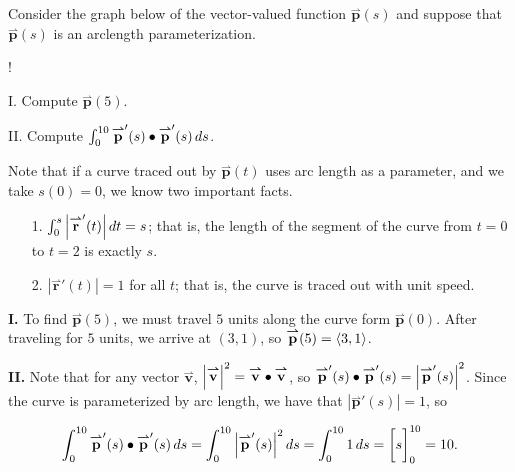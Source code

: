 \documentclass[noauthor,handout]{ximera}
\newcommand{\Mag}[1]{\left| \vec{#1} \right|}
\renewcommand{\vec}[1]{{\overset{\boldsymbol{\rightharpoonup}}{\mathbf{#1}}}}
\begin{document}

\begin{problem}
Consider the graph below of the vector-valued
function $\vec{p}(s)$ and suppose that $\vec{p}(s)$ is
an arclength parameterization.   %

\begin{center}
\resizebox {6cm} {!} { 
    }
\end{center}

I. Compute $\vec{p}(5)$.

II. Compute $\int_0^{10} \vec{p}'(s)\dotp\vec{p}'(s)\d s$.

\begin{freeResponse}
Note that if a curve traced out by $\vec{p}(t)$ uses arc length as a parameter, and we take $s(0)=0$, we know two important facts.

\begin{itemize}
\item[1.] $\int_0^s \left|\vec{r}'(t)\right| \d t = s$; that is, the length of the segment of the curve from $t=0$ to $t=2$ is exactly $s$.
\item[2.] $ \left|\vec{r}'(t)\right| = 1 $ for all $t$; that is, the curve is traced out with unit speed.
\end{itemize} 

\textbf{I.} To find $\vec{p}(5)$, we must travel $5$ units along the curve form $\vec{p}(0)$.  After traveling for $5$ units, we arrive at $(3,1)$, so $\vec{p}(5) = \vector{3,1}$.

\textbf{II.} Note that for any vector $\vec{v}$, $\Mag{v}^2 = \vec{v} \dotp \vec{v}$, so $\vec{p}'(s)\dotp\vec{p}'(s) = \left|\vec{p}'(s)\right|^2$.  Since the curve is parameterized by arc length, we have that $\left|\vec{p}'(s)\right| =1$, so 

\[
\int_0^{10} \vec{p}'(s)\dotp\vec{p}'(s)\d s = \int_0^{10} \left|\vec{p}'(s)\right|^2 \d s= \int_0^{10} 1 \d s = \eval{s}_0^{10} = 10. 
\]
\end{freeResponse}
\end{problem}
\end{document}
